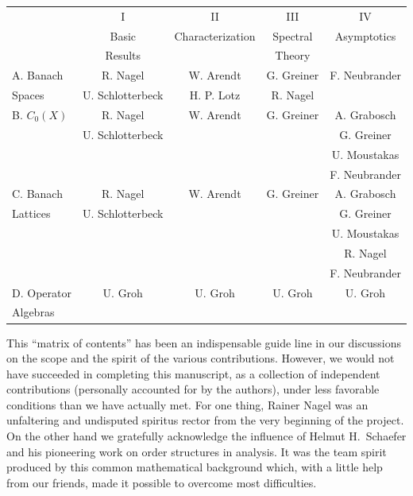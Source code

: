 \begin{table}[ht]
\centering
\begin{tabular}{l|c|c|c|c|}
\cline{2-5}
 & I & II & III & IV \\
 & Basic & Characterization & Spectral & Asymptotics \\
 & Results &  & Theory & \\
\hline
\multicolumn{1}{|l|}{A. Banach} & R. Nagel & W. Arendt & G. Greiner & F. Neubrander \\
\multicolumn{1}{|l|}{Spaces} & U. Schlotterbeck & H. P. Lotz & R. Nagel & \\
\hline
\multicolumn{1}{|l|}{B. $C_0(X)$} & R. Nagel & W. Arendt & G. Greiner & A. Grabosch \\
\multicolumn{1}{|l|}{} & U. Schlotterbeck & & & G. Greiner \\
\multicolumn{1}{|l|}{} & & & & U. Moustakas \\
\multicolumn{1}{|l|}{} & & & & F. Neubrander \\
\hline
\multicolumn{1}{|l|}{C. Banach} & R. Nagel & W. Arendt & G. Greiner & A. Grabosch \\
\multicolumn{1}{|l|}{Lattices} & U. Schlotterbeck & & & G. Greiner \\
\multicolumn{1}{|l|}{} & & & & U. Moustakas \\
\multicolumn{1}{|l|}{} & & & & R. Nagel \\
\multicolumn{1}{|l|}{} & & & & F. Neubrander \\
\hline
\multicolumn{1}{|l|}{D. Operator} & U. Groh & U. Groh & U. Groh & U. Groh \\
\multicolumn{1}{|l|}{Algebras} & & & & \\
\hline
\end{tabular}
\end{table}
This \enquote{matrix of contents} has been an indispensable guide line in our discussions on the scope and the spirit of the various contributions. 
However, we would not have succeeded in completing this manuscript, as a collection of independent contributions (personally accounted for by the authors), under less favorable conditions than we have actually met. 
For one thing, Rainer Nagel was an unfaltering and undisputed spiritus rector from the very beginning of the project. 
On the other hand we gratefully acknowledge the influence of Helmut H.~Schaefer and his pioneering work on order structures in analysis. 
It was the team spirit produced by this common mathematical background which, with a little help from our friends, made it possible to overcome most difficulties.


